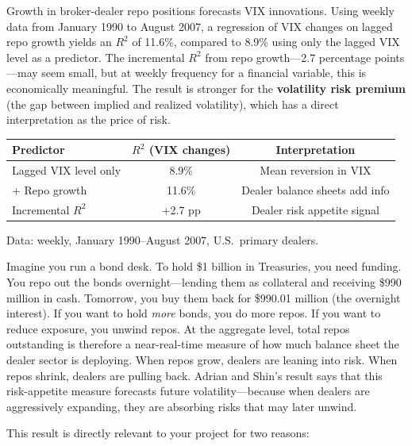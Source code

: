 \begin{keyresult}
Growth in broker-dealer repo positions forecasts VIX innovations. Using weekly data from January 1990 to August 2007, a regression of VIX changes on lagged repo growth yields an $R^2$ of 11.6\%, compared to 8.9\% using only the lagged VIX level as a predictor. The incremental $R^2$ from repo growth---2.7 percentage points---may seem small, but at weekly frequency for a financial variable, this is economically meaningful. The result is stronger for the \textbf{volatility risk premium} (the gap between implied and realized volatility), which has a direct interpretation as the price of risk.
\begin{center}
\begin{tabular}{lcc}
\toprule
\textbf{Predictor} & \textbf{$R^2$ (VIX changes)} & \textbf{Interpretation} \\
\midrule
Lagged VIX level only & 8.9\% & Mean reversion in VIX \\
+ Repo growth & 11.6\% & Dealer balance sheets add info \\
Incremental $R^2$ & +2.7 pp & Dealer risk appetite signal \\
\bottomrule
\end{tabular}
\end{center}
Data: weekly, January 1990--August 2007, U.S.\ primary dealers.
\end{keyresult}

\begin{intuition}
Imagine you run a bond desk. To hold \$1 billion in Treasuries, you need funding. You repo out the bonds overnight---lending them as collateral and receiving \$990 million in cash. Tomorrow, you buy them back for \$990.01 million (the overnight interest). If you want to hold \emph{more} bonds, you do more repos. If you want to reduce exposure, you unwind repos. At the aggregate level, total repos outstanding is therefore a near-real-time measure of how much balance sheet the dealer sector is deploying. When repos grow, dealers are leaning into risk. When repos shrink, dealers are pulling back. Adrian and Shin's result says that this risk-appetite measure forecasts future volatility---because when dealers are aggressively expanding, they are absorbing risks that may later unwind.
\end{intuition}

This result is directly relevant to your project for two reasons:


